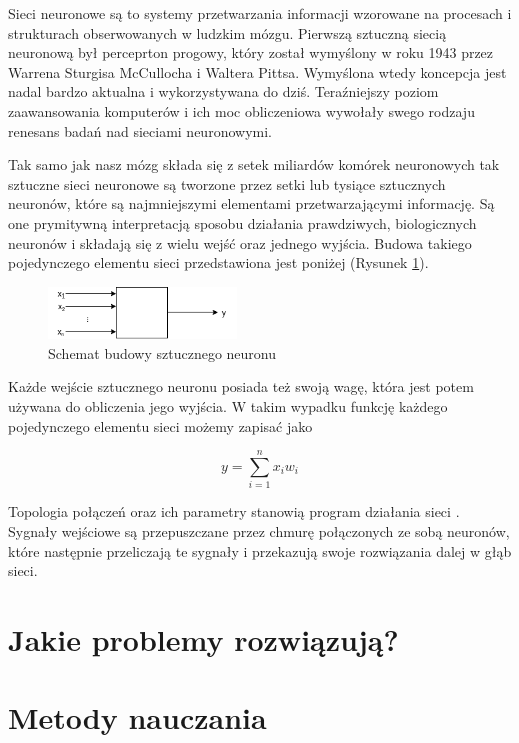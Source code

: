 \documentclass[12pt, oneside]{report}
\begin{document}
Sieci neuronowe są to systemy przetwarzania informacji wzorowane na procesach i strukturach obserwowanych w ludzkim mózgu. Pierwszą sztuczną siecią neuronową był perceprton progowy, który został wymyślony w roku 1943 przez Warrena Sturgisa McCullocha i Waltera Pittsa. Wymyślona wtedy koncepcja jest nadal bardzo aktualna i wykorzystywana do dziś. Teraźniejszy poziom zaawansowania komputerów i ich moc obliczeniowa wywołały swego rodzaju renesans badań nad sieciami neuronowymi.

Tak samo jak nasz mózg składa się z setek miliardów komórek neuronowych tak sztuczne sieci neuronowe są tworzone przez setki lub tysiące sztucznych neuronów, które są najmniejszymi elementami przetwarzającymi informację. Są one prymitywną interpretacją sposobu działania prawdziwych, biologicznych neuronów i składają się z wielu wejść oraz jednego wyjścia. Budowa takiego pojedynczego elementu sieci przedstawiona jest poniżej (Rysunek \ref{fig: 2.1}).

\begin{figure}[h]
	\centering
	\includegraphics[width=5cm]{fig211.png}
	\caption{Schemat budowy sztucznego neuronu}
	\label{fig: 2.1}
\end{figure}

Każde wejście sztucznego neuronu posiada też swoją wagę, która jest potem używana do obliczenia jego wyjścia. W takim wypadku funkcję każdego pojedynczego elementu sieci możemy zapisać jako

\begin{equation}\label{eq: 2.1}
y = \sum^{n}_{i=1} x_{i}w_{i}
\end{equation}


Topologia połączeń oraz ich parametry stanowią program działania sieci \cite{tadeusiewicz1993sieci}. Sygnały wejściowe są przepuszczane przez chmurę połączonych ze sobą neuronów, które następnie przeliczają te sygnały i przekazują swoje rozwiązania dalej w głąb sieci.



\section{Jakie problemy rozwiązują?}
\section{Metody nauczania}
\end{document}
